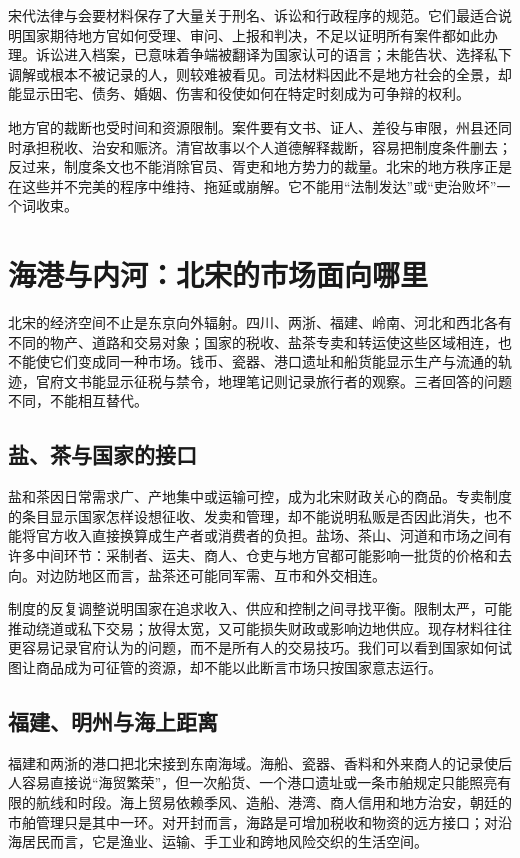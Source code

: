 宋代法律与会要材料保存了大量关于刑名、诉讼和行政程序的规范。它们最适合说明国家期待地方官如何受理、审问、上报和判决，不足以证明所有案件都如此办理。诉讼进入档案，已意味着争端被翻译为国家认可的语言；未能告状、选择私下调解或根本不被记录的人，则较难被看见。司法材料因此不是地方社会的全景，却能显示田宅、债务、婚姻、伤害和役使如何在特定时刻成为可争辩的权利。

地方官的裁断也受时间和资源限制。案件要有文书、证人、差役与审限，州县还同时承担税收、治安和赈济。清官故事以个人道德解释裁断，容易把制度条件删去；反过来，制度条文也不能消除官员、胥吏和地方势力的裁量。北宋的地方秩序正是在这些并不完美的程序中维持、拖延或崩解。它不能用“法制发达”或“吏治败坏”一个词收束。

\section{海港与内河：北宋的市场面向哪里}

北宋的经济空间不止是东京向外辐射。四川、两浙、福建、岭南、河北和西北各有不同的物产、道路和交易对象；国家的税收、盐茶专卖和转运使这些区域相连，也不能使它们变成同一种市场。钱币、瓷器、港口遗址和船货能显示生产与流通的轨迹，官府文书能显示征税与禁令，地理笔记则记录旅行者的观察。三者回答的问题不同，不能相互替代。

\subsection{盐、茶与国家的接口}

盐和茶因日常需求广、产地集中或运输可控，成为北宋财政关心的商品。专卖制度的条目显示国家怎样设想征收、发卖和管理，却不能说明私贩是否因此消失，也不能将官方收入直接换算成生产者或消费者的负担。盐场、茶山、河道和市场之间有许多中间环节：采制者、运夫、商人、仓吏与地方官都可能影响一批货的价格和去向。对边防地区而言，盐茶还可能同军需、互市和外交相连。

制度的反复调整说明国家在追求收入、供应和控制之间寻找平衡。限制太严，可能推动绕道或私下交易；放得太宽，又可能损失财政或影响边地供应。现存材料往往更容易记录官府认为的问题，而不是所有人的交易技巧。我们可以看到国家如何试图让商品成为可征管的资源，却不能以此断言市场只按国家意志运行。

\subsection{福建、明州与海上距离}

福建和两浙的港口把北宋接到东南海域。海船、瓷器、香料和外来商人的记录使后人容易直接说“海贸繁荣”，但一次船货、一个港口遗址或一条市舶规定只能照亮有限的航线和时段。海上贸易依赖季风、造船、港湾、商人信用和地方治安，朝廷的市舶管理只是其中一环。对开封而言，海路是可增加税收和物资的远方接口；对沿海居民而言，它是渔业、运输、手工业和跨地风险交织的生活空间。

